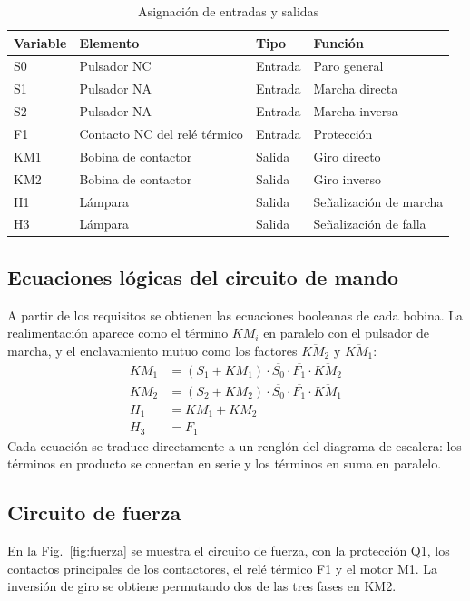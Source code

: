\documentclass[conference,a4paper,10pt]{IEEEtran}
\begin{document}
\begin{table}[!t]
\renewcommand{\arraystretch}{1.15}
\caption{Asignación de entradas y salidas}
\label{tab:io}
\centering
\footnotesize
\begin{tabular}{@{}llll@{}}
\toprule
\textbf{Variable} & \textbf{Elemento} & \textbf{Tipo} & \textbf{Función} \\
\midrule
S0 & Pulsador NC   & Entrada & Paro general \\
S1 & Pulsador NA   & Entrada & Marcha directa \\
S2 & Pulsador NA   & Entrada & Marcha inversa \\
F1 & Contacto NC del relé térmico & Entrada & Protección \\
KM1 & Bobina de contactor & Salida & Giro directo \\
KM2 & Bobina de contactor & Salida & Giro inverso \\
H1 & Lámpara & Salida & Señalización de marcha \\
H3 & Lámpara & Salida & Señalización de falla \\
\bottomrule
\end{tabular}
\end{table}

\subsection{Ecuaciones lógicas del circuito de mando}
A partir de los requisitos se obtienen las ecuaciones booleanas de cada
bobina. La realimentación aparece como el término $KM_i$ en paralelo con el
pulsador de marcha, y el enclavamiento mutuo como los factores
$\overline{KM_2}$ y $\overline{KM_1}$:
\begin{align}
  KM_1 &= (S_1 + KM_1)\cdot \overline{S_0}\cdot \overline{F_1}\cdot \overline{KM_2} \label{eq:km1}\\
  KM_2 &= (S_2 + KM_2)\cdot \overline{S_0}\cdot \overline{F_1}\cdot \overline{KM_1} \label{eq:km2}\\
  H_1  &= KM_1 + KM_2 \label{eq:h1}\\
  H_3  &= F_1 \label{eq:h3}
\end{align}
Cada ecuación se traduce directamente a un renglón del diagrama de escalera:
los términos en producto se conectan en serie y los términos en suma en
paralelo.

\subsection{Circuito de fuerza}
En la Fig.~\ref{fig:fuerza} se muestra el circuito de fuerza, con la
protección Q1, los contactos principales de los contactores, el relé térmico
F1 y el motor M1. La inversión de giro se obtiene permutando dos de las tres
fases en KM2.
\end{document}

